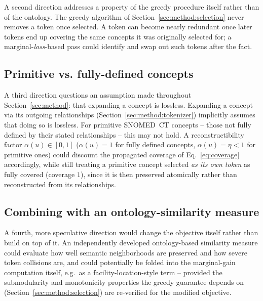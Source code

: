 A second direction addresses a property of the greedy procedure itself
rather than of the ontology. The greedy algorithm of Section~\ref{sec:method:selection} never removes a
token once selected. A token can become nearly redundant once later tokens
end up covering the same concepts it was originally selected for; a
marginal-\emph{loss}-based pass could identify and swap out such tokens
after the fact.

\subsection{Primitive vs. fully-defined concepts}


A third direction questions an assumption made throughout
Section~\ref{sec:method}: that expanding a concept is lossless. Expanding a concept via its outgoing relationships
(Section~\ref{sec:method:tokenizer}) implicitly assumes that doing so is
lossless. For primitive SNOMED~CT concepts -- those not fully defined by
their stated relationships -- this may not hold. A reconstructibility factor
$\alpha(u) \in [0,1]$ ($\alpha(u)=1$ for fully defined concepts,
$\alpha(u)=\eta < 1$ for primitive ones) could discount the propagated
coverage of Eq.~\eqref{eq:coverage} accordingly, while still treating a
primitive concept selected \emph{as its own token} as fully covered
(coverage $1$), since it is then preserved atomically rather than
reconstructed from its relationships.

\subsection{Combining with an ontology-similarity measure}


A fourth, more speculative direction would change the objective itself
rather than build on top of it. An independently developed ontology-based similarity measure
 could evaluate how well semantic neighborhoods are
preserved and how severe token collisions are, and could potentially be
folded into the marginal-gain computation itself, e.g.\ as a
facility-location-style term -- provided the submodularity and monotonicity
properties the greedy guarantee depends on
(Section~\ref{sec:method:selection}) are re-verified for the modified
objective.
